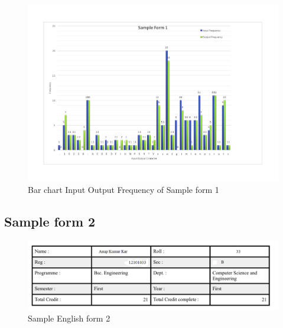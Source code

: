 \begin{figure}[H]
\centering
\includegraphics[width=1\textwidth]{form1.pdf}
\caption {Bar chart Input Output Frequency of Sample form 1}
\label {fig:bar1}
\end{figure}

\subsection{Sample form 2}

\begin{figure}[H]
\centering
\includegraphics[width=1\textwidth]{form2.png}
\caption {Sample English form 2}
\label {fig:form2}
\end{figure}

